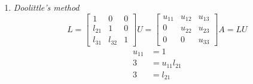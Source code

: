 \documentclass[12pt, letterpaper]{article}
\begin{document}
\begin{itemize}
\begin{enumerate}
\begin{align*}
		&= E_1^{-1} E_2^{-1} E_3^{-1}\\
		&= E_1^{-1} \begin{bmatrix}
			1 & 0 & 0\\
			0 & 1 & 0\\
			6 & 0 & 1
			\end{bmatrix}\begin{bmatrix}
				1 & 0 &0\\
				0 & 1 & 0\\
				0 & 11 & 1 
			\end{bmatrix}\\
			&= E_1^{-1} \begin{bmatrix}
			1 & 0 & 0\\
			0 & 1 & 0\\
			6 & 11 & 1
			\end{bmatrix}\\
			&= \begin{bmatrix}
			1 & 0 & 0\\
			3 & 1 & 0\\
			0 & 0 & 1
			\end{bmatrix}\begin{bmatrix}
			1 & 0 & 0\\
			0 & 1 & 0\\
			6 & 11 & 1
			\end{bmatrix}\\
			&= \begin{bmatrix}
			1 & 0 & 0\\
			3 & 1 & 0\\
			6 & 11 & 1
			\end{bmatrix}\\
		\end{align*}
		\item \textit{Doolittle's method}
		$$L = \begin{bmatrix}
		1 & 0 &0\\
		l_{21} & 1 & 0\\
		l_{31} & l_{32} & 1		
		\end{bmatrix}		
		U= \begin{bmatrix}
		u_{11} & u_{12} & u_{13}\\
		0 & u_{22} & u_{23}\\
		0 & 0 & u_{33} 
		\end{bmatrix} 
		A = LU		
		$$
		\begin{align*}
			u_{11}  &= 1\\
			3 &= u_{11} l_{21}\\
			3 &= l_{21}\\

\end{align*}
\end{enumerate}
\end{itemize}
\end{document}
